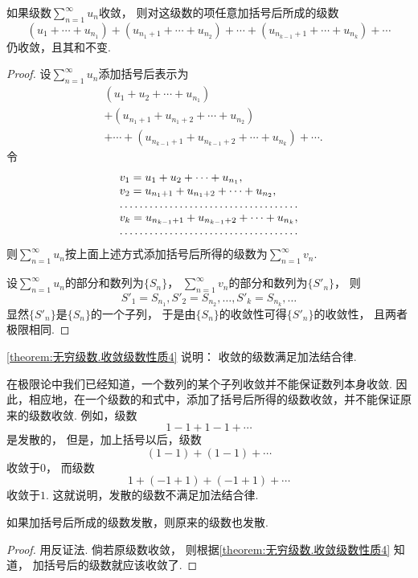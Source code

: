 \begin{property}\label{theorem:无穷级数.收敛级数性质4}
如果级数\(\sum_{n=1}^\infty u_n\)收敛，
则对这级数的项任意加括号后所成的级数\[
	(u_1+\dotsb+u_{n_1})
	+ (u_{n_1+1}+\dotsb+u_{n_2})
	+ \dotsb
	+ (u_{n_{k-1}+1}+\dotsb+u_{n_k}) + \dotsb
\]仍收敛，且其和不变.
\begin{proof}
设\(\sum_{n=1}^\infty u_n\)添加括号后表示为\begin{align*}
	&(u_1 + u_2 + \dotsb + u_{n_1}) \\
	&+ (u_{n_1+1} + u_{n_1+2} + \dotsb + u_{n_2}) \\
	&+ \dotsb + (u_{n_{k-1}+1} + u_{n_{k-1}+2} + \dotsb + u_{n_k}) + \dotsb.
\end{align*}
令\[
	\begin{array}{l}
		v_1 = u_1 + u_2 + \dotsb + u_{n_1}, \\
		v_2 = u_{n_1+1} + u_{n_1+2} + \dotsb + u_{n_2}, \\
		\hdotsfor{1} \\
		v_k = u_{n_{k-1}+1} + u_{n_{k-1}+2} + \dotsb + u_{n_k}, \\
		\hdotsfor{1}
	\end{array}
\]
则\(\sum_{n=1}^\infty u_n\)按上面上述方式添加括号后所得的级数为\(\sum_{n=1}^\infty v_n\).

设\(\sum_{n=1}^\infty u_n\)的部分和数列为\(\{S_n\}\)，
\(\sum_{n=1}^\infty v_n\)的部分和数列为\(\{S'_n\}\)，
则\[
	S'_1 = S_{n_1},
	S'_2 = S_{n_2},
	\dotsc,
	S'_k = S_{n_k},
	\dotsc
\]
显然\(\{S'_n\}\)是\(\{S_n\}\)的一个子列，
于是由\(\{S_n\}\)的收敛性可得\(\{S'_n\}\)的收敛性，
且两者极限相同.
\end{proof}
\end{property}
\begin{remark}
\cref{theorem:无穷级数.收敛级数性质4} 说明：
收敛的级数满足加法结合律.
\end{remark}
\begin{remark}
在极限论中我们已经知道，一个数列的某个子列收敛并不能保证数列本身收敛.
因此，相应地，在一个级数的和式中，添加了括号后所得的级数收敛，并不能保证原来的级数收敛.
例如，级数\[
	1-1+1-1+\dotsb
\]是发散的，
但是，加上括号以后，级数\[
	(1-1)+(1-1)+\dotsb
\]收敛于\(0\)，
而级数\[
	1+(-1+1)+(-1+1)+\dotsb
\]收敛于\(1\).
这就说明，发散的级数不满足加法结合律.
\end{remark}
\begin{corollary}
如果加括号后所成的级数发散，则原来的级数也发散.
\begin{proof}
用反证法.
倘若原级数收敛，
则根据\cref{theorem:无穷级数.收敛级数性质4} 知道，
加括号后的级数就应该收敛了.
\end{proof}
\end{corollary}

